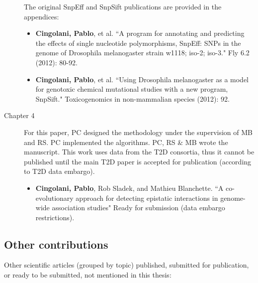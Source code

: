 \begin{description}
	The original SnpEff and SnpSift publications are provided in the appendices:
	
		\begin{itemize}
		
		\item \textbf{Cingolani, Pablo}, et al. ``A program for annotating and predicting the effects of single nucleotide polymorphisms, SnpEff: SNPs in the genome of Drosophila melanogaster strain w1118; iso-2; iso-3." Fly 6.2 (2012): 80-92.
		
		\item \textbf{Cingolani, Pablo}, et al. ``Using Drosophila melanogaster as a model for genotoxic chemical mutational studies with a new program, SnpSift." Toxicogenomics in non-mammalian species (2012): 92.
		
		\end{itemize}
	
	
	\item[Chapter 4] For this paper, PC designed the methodology under the supervision of MB and RS. PC implemented the algorithms. PC, RS \& MB wrote the manuscript. This work uses data from the T2D consortia, thus it cannot be published until the main T2D paper is accepted for publication (according to T2D data embargo).
	
		\begin{itemize}
		\item \textbf{Cingolani, Pablo}, Rob Sladek, and Mathieu Blanchette. ``A co-evolutionary approach for detecting epistatic interactions in genome-wide association studies" Ready for submission (data embargo restrictions).
		\end{itemize}
	
	
\end{description}

\subsection{Other contributions}

Other scientific articles (grouped by topic) published, submitted for publication, or ready to be submitted, not mentioned in this thesis:

